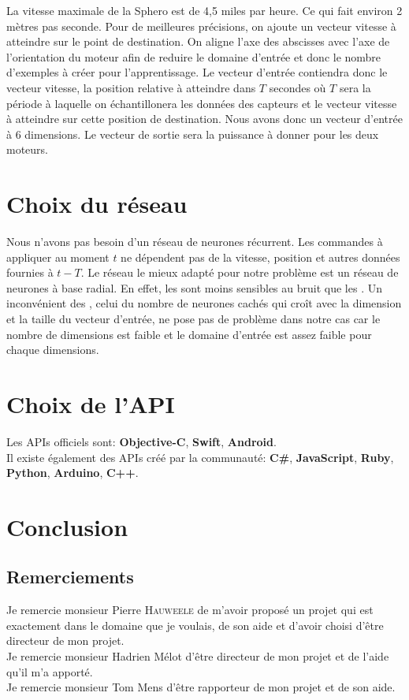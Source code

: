 \documentclass[12pt,a4paper,oneside, titlepage]{article}
\begin{document}
La vitesse maximale de la Sphero est de 4,5 miles par heure\cite{product}.
Ce qui fait environ 2 mètres pas seconde.
Pour de meilleures précisions, on ajoute un vecteur vitesse à atteindre sur le point de destination.
On aligne l'axe des abscisses avec l'axe de l'orientation du moteur afin de reduire le domaine d'entrée et donc le nombre d'exemples à créer pour l'apprentissage.
Le vecteur d'entrée contiendra donc le vecteur vitesse, la position relative à atteindre dans $T$ secondes où $T$ sera la période à laquelle on échantillonera les données des capteurs et le vecteur vitesse à atteindre sur cette position de destination.
Nous avons donc un vecteur d'entrée à 6 dimensions.
Le vecteur de sortie sera la puissance à donner pour les deux moteurs.

\section{Choix du réseau}
Nous n'avons pas besoin d'un réseau de neurones récurrent. Les commandes à appliquer au moment $t$ ne dépendent pas de la vitesse, position et autres données fournies à $t-T$.
Le réseau le mieux adapté pour notre problème est un réseau de neurones à base radial.
En effet, les \rbf sont moins sensibles au bruit que les \mlp \cite{adversarial,Gauthier}.%
Un inconvénient des \rbf, celui du nombre de neurones cachés qui croît avec la dimension et la taille du vecteur d'entrée, ne pose pas de problème dans notre cas
car le nombre de dimensions est faible
et le domaine d'entrée est assez faible pour chaque dimensions.
\section{Choix de l'API}
Les APIs officiels sont:\cite{SDKofficiels} \textbf{Objective-C}, \textbf{Swift}, \textbf{Android}.\\
Il existe également des APIs créé par la communauté:\cite{gosphero} \textbf{C\#}, \textbf{JavaScript}, \textbf{Ruby}, \textbf{Python}\cite{pythonAPI}, \textbf{Arduino}, \textbf{C++}\cite{cppAPI}.\\
\section{Conclusion}
\subsection*{Remerciements}
\noindent Je remercie monsieur Pierre \textsc{Hauweele} de m'avoir proposé un projet qui est exactement dans le domaine que je voulais, de son aide et d'avoir choisi d'être directeur de mon projet.\\

\noindent Je remercie monsieur Hadrien Mélot d'être directeur de mon projet et de l'aide qu'il m'a apporté.\\

\noindent Je remercie monsieur Tom Mens d'être rapporteur de mon projet et de son aide.\\



\end{document}
